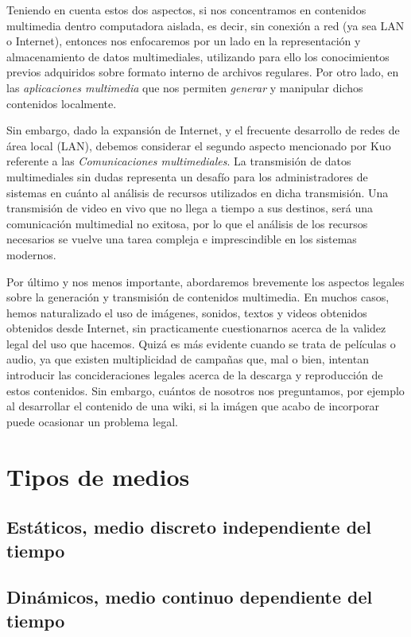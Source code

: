 \documentclass[12pt]{article}
\begin{document}
Teniendo en cuenta estos dos aspectos, si nos concentramos en contenidos multimedia 
dentro computadora aislada, es decir,  sin conexión a red (ya sea LAN o 
Internet), entonces nos enfocaremos por un lado en la representación y almacenamiento 
de datos multimediales, utilizando para ello los conocimientos previos 
adquiridos sobre formato interno de archivos regulares. Por otro lado, en 
las {\it aplicaciones multimedia} que nos permiten {\it generar} y manipular 
dichos contenidos localmente. 

Sin embargo, dado la expansión de Internet, y el frecuente desarrollo 
de redes de área local (LAN), debemos considerar el segundo aspecto mencionado
por Kuo referente a las {\it Comunicaciones multimediales}. La transmisión 
de datos multimediales sin dudas representa un desafío para los administradores
de sistemas en cuánto al análisis de recursos utilizados en dicha transmisión.
Una transmisión de video en vivo que no llega a tiempo a sus destinos, será 
una comunicación multimedial no exitosa, por lo que el análisis de los 
recursos necesarios se vuelve una tarea compleja e imprescindible en los 
sistemas modernos. 

Por último y nos menos importante, abordaremos brevemente los aspectos legales 
sobre la generación y transmisión de contenidos multimedia. En muchos casos,
hemos naturalizado el uso de imágenes, sonidos, textos y videos obtenidos 
obtenidos desde Internet, sin practicamente cuestionarnos acerca de la validez 
legal del uso que hacemos. Quizá es más evidente cuando se trata de 
películas o audio, ya que existen multiplicidad de campañas que, mal o 
bien, intentan introducir las concideraciones legales acerca de la descarga y 
reproducción de estos contenidos. Sin embargo, cuántos de nosotros nos 
preguntamos, por ejemplo al desarrollar el contenido de una wiki, si la 
imágen que acabo de incorporar puede ocasionar un problema legal. 

\section*{Tipos de medios}
\subsection*{Estáticos, medio discreto independiente del tiempo}
\subsection*{Dinámicos, medio continuo dependiente del tiempo}
\end{document}
